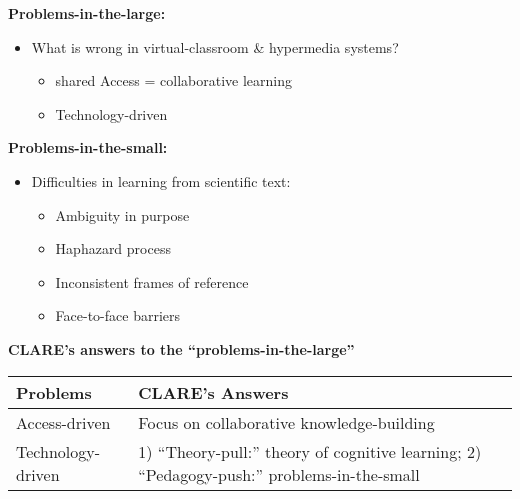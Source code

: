 \begin{slide} \Huge 
  {\bf Problems-in-the-large:}
  \horizontalline    
  \begin{itemize}
  \item What is wrong in virtual-classroom \& hypermedia systems?
    \begin{itemize}
      \item shared Access = collaborative learning

      \item Technology-driven
    \end{itemize}      
    \end{itemize}
\end{slide} \Huge


\begin{slide} \Huge
  {\bf Problems-in-the-small:}
  \horizontalline  

  \begin{itemize}
  \item Difficulties in learning from scientific text:
   \begin{itemize}
   \item Ambiguity in purpose
       
   \item Haphazard process
    
   \item Inconsistent frames of reference
    
   \item Face-to-face barriers
   \end{itemize}
   \end{itemize}
\end{slide} \Huge


\begin{slide} \Huge
  {\bf CLARE's answers to the ``problems-in-the-large''}
  \horizontalline
    
  \begin{center}
   \begin{tabular} {||p{3.5in}|p{5.0in}||} \hline   
     {\bf Problems} & {\bf CLARE's Answers} \\ \hline \hline
    
     Access-driven & Focus on collaborative knowledge-building \\
     \hline
     
    Technology-driven & 1) ``Theory-pull:'' theory of
    cognitive learning; 2) ``Pedagogy-push:'' problems-in-the-small \\
    \hline \hline
   \end{tabular}
  \end{center}
\end{slide} \Huge


